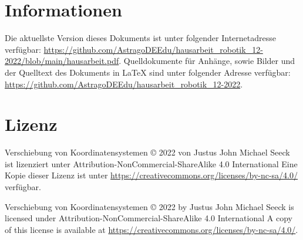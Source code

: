 \documentclass{article}
\begin{document}
    \section{Informationen}

    Die aktuellste Version dieses Dokuments ist unter folgender Internetadresse verfügbar:
    \url{https://github.com/AstragoDEEdu/hausarbeit_robotik_12-2022/blob/main/hausarbeit.pdf}.
    Quelldokumente für Anhänge, sowie Bilder und der Quelltext des Dokuments in \LaTeX{} sind unter folgender Adresse verfügbar:
    \url{https://github.com/AstragoDEEdu/hausarbeit_robotik_12-2022}.

    \section{Lizenz}

    Verschiebung von Koordinatensystemen © 2022 von Justus John Michael Seeck ist lizenziert unter Attribution-NonCommercial-ShareAlike 4.0 International
    Eine Kopie dieser Lizenz ist unter \url{https://creativecommons.org/licenses/by-nc-sa/4.0/} verfügbar.

    Verschiebung von Koordinatensystemen © 2022 by Justus John Michael Seeck is licensed under Attribution-NonCommercial-ShareAlike 4.0 International
    A copy of this license is available at \url{https://creativecommons.org/licenses/by-nc-sa/4.0/}.
\end{document}
